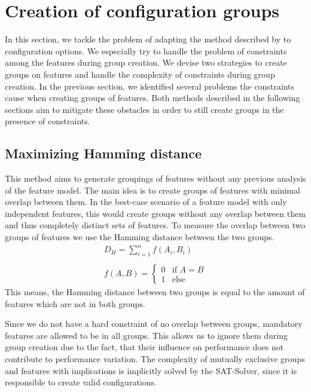 \documentclass[../../thesis.tex]{subfiles}
\begin{document}
\section{Creation of configuration groups}\label{sec:group_sampling:creation_of_groups}

In this section, we tackle the problem of adapting the method described by \citet{saltelli2008global}
to configuration options. We especially try to handle the problem of constraints among the
features during group creation. We devise two strategies to create groups on features and
handle the complexity of constraints during group creation.
In the previous section, we identified several problems the constraints cause when creating
groups of features. Both methods described in the following sections aim to mitigate these obstacles
in order to still create groups in the presence of constraints.


\subsection{Maximizing Hamming distance}\label{sec:group_sampling:creation_of_groups:hamming}

This method aims to generate groupings of features without any previous analysis of the feature model.
The main idea is to create groups of features with minimal overlap between them.
In the best-case scenario of a feature model with only independent features,
this would create groups without any overlap between them and thus completely distinct
sets of features.
To measure the overlap between two groups of features we use the Hamming distance between the two groups.
\begin{equation} \label{eq:group_sampling:creation_of_groups:hamming:hamming_distance}
    \begin{aligned}
        D_{H} = \sum_{i=1}^{n} f(A_i, B_i)
        \\ \\
        f(A,B) =
        \left\{
        \begin{array}{ll}
            0 & \mbox{if } A = B \\
            1 & \mbox{else }
        \end{array}
        \right.
    \end{aligned}
\end{equation}
This means, the Hamming distance between two groups is equal to the amount
of features which are not in both groups.

Since we do not have a hard constraint of no overlap between groups, mandatory features
are allowed to be in all groups. This allows us to ignore them during group creation due to the fact,
that their influence on performance does not contribute to performance variation.
The complexity of mutually exclusive groups and features with implications
is implicitly solved by the SAT-Solver, since it is responsible to create valid configurations.
\end{document}
